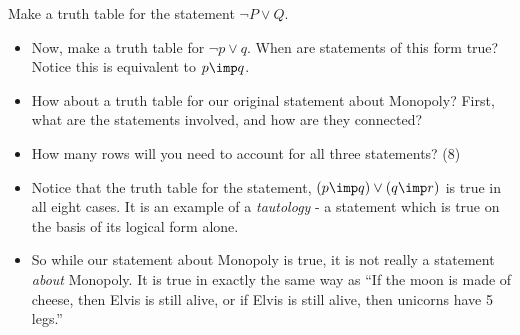 \begin{example}
 Make a truth table for the statement $\neg P \vee Q$.


\end{example}


\begin{itemize}
	\item Now, make a truth table for $\neg p \vee q$.  When are statements of this form true?  Notice this is equivalent to $p \imp q$.
	\item How about a truth table for our original statement about Monopoly?  First, what are the statements involved, and how are they connected?
	\item How many rows will you need to account for all three statements? (8)
	\item Notice that the truth table for the statement, $(p \imp q) \vee (q \imp r)$ is true in all eight cases.  It is an example of a {\em tautology} - a statement which is true on the basis of its logical form alone.
	\item So while our statement about Monopoly is true, it is not really a statement {\em about} Monopoly.  It is true in exactly the same way as ``If the moon is made of cheese, then Elvis is still alive, or if Elvis is still alive, then unicorns have 5 legs.''
\end{itemize}





